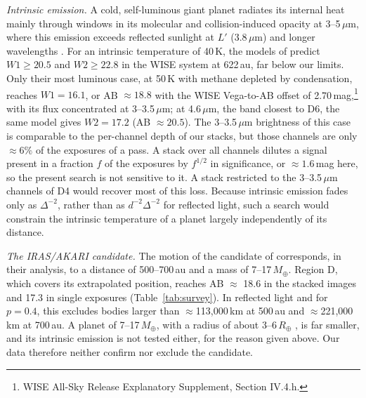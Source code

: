 \documentclass[twocolumn,linenumbers,anonymous]{aastex702}
\begin{document}
\emph{Intrinsic emission.} A cold, self-luminous giant planet radiates its internal heat mainly through windows in its molecular and collision-induced opacity at 3--5\,$\mu$m, where this emission exceeds reflected sunlight at $L'$ (3.8\,$\mu$m) and longer wavelengths \citep{fortney16}. For an intrinsic temperature of 40\,K, the models of \citet{fortney16} predict $W1 \ge 20.5$ and $W2 \ge 22.8$ in the WISE system at 622\,au, far below our limits. Only their most luminous case, at 50\,K with methane depleted by condensation, reaches $W1 = 16.1$, or AB $\approx 18.8$ with the WISE Vega-to-AB offset of 2.70\,mag,\footnote{WISE All-Sky Release Explanatory Supplement, Section IV.4.h.} with its flux concentrated at 3--3.5\,$\mu$m; at 4.6\,$\mu$m, the band closest to D6, the same model gives $W2 = 17.2$ (AB $\approx 20.5$). The 3--3.5\,$\mu$m brightness of this case is comparable to the per-channel depth of our stacks, but those channels are only $\approx 6\%$ of the exposures of a pass. A stack over all channels dilutes a signal present in a fraction $f$ of the exposures by $f^{1/2}$ in significance, or $\approx 1.6$\,mag here, so the present search is not sensitive to it. A stack restricted to the 3--3.5\,$\mu$m channels of D4 would recover most of this loss. Because intrinsic emission fades only as $\Delta^{-2}$, rather than as $d^{-2}\Delta^{-2}$ for reflected light, such a search would constrain the intrinsic temperature of a planet largely independently of its distance.

\emph{The IRAS/AKARI candidate.} The motion of the candidate of \citet{phan25} corresponds, in their analysis, to a distance of 500--700\,au and a mass of 7--17\,$M_\oplus$. Region D, which covers its extrapolated position, reaches AB $\approx$ 18.6 in the stacked images and 17.3 in single exposures (Table~\ref{tab:survey}). In reflected light and for $p = 0.4$, this excludes bodies larger than $\approx$113{,}000\,km at 500\,au and $\approx$221{,}000\,km at 700\,au. A planet of 7--17\,$M_\oplus$, with a radius of about 3--6\,$R_\oplus$ \citep{fortney16}, is far smaller, and its intrinsic emission is not tested either, for the reason given above. Our data therefore neither confirm nor exclude the candidate.
\end{document}
